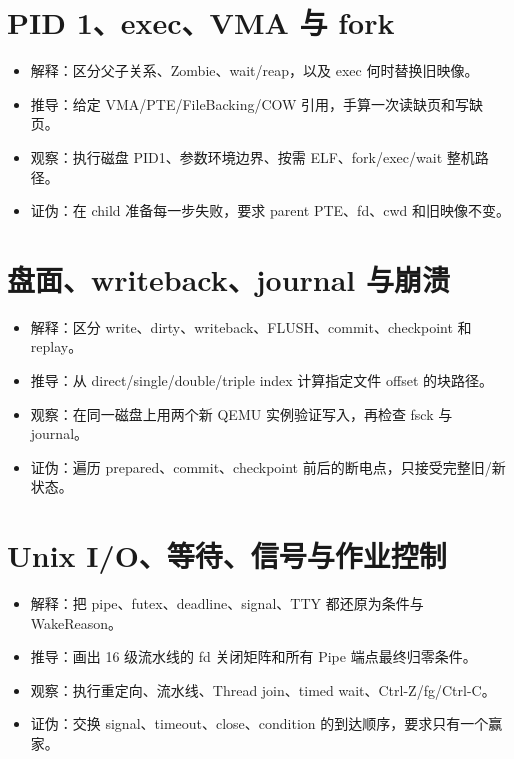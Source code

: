 \section*{PID 1、exec、VMA 与 fork}

\begin{itemize}
  \item 解释：区分父子关系、Zombie、wait/reap，以及 exec 何时替换旧映像。
  \item 推导：给定 VMA/PTE/FileBacking/COW 引用，手算一次读缺页和写缺页。
  \item 观察：执行磁盘 PID1、参数环境边界、按需 ELF、fork/exec/wait 整机路径。
  \item 证伪：在 child 准备每一步失败，要求 parent PTE、fd、cwd 和旧映像不变。
\end{itemize}

\section*{盘面、writeback、journal 与崩溃}

\begin{itemize}
  \item 解释：区分 write、dirty、writeback、FLUSH、commit、checkpoint 和 replay。
  \item 推导：从 direct/single/double/triple index 计算指定文件 offset 的块路径。
  \item 观察：在同一磁盘上用两个新 QEMU 实例验证写入，再检查 fsck 与 journal。
  \item 证伪：遍历 prepared、commit、checkpoint 前后的断电点，只接受完整旧/新状态。
\end{itemize}

\section*{Unix I/O、等待、信号与作业控制}

\begin{itemize}
  \item 解释：把 pipe、futex、deadline、signal、TTY 都还原为条件与 WakeReason。
  \item 推导：画出 16 级流水线的 fd 关闭矩阵和所有 Pipe 端点最终归零条件。
  \item 观察：执行重定向、流水线、Thread join、timed wait、Ctrl-Z/fg/Ctrl-C。
  \item 证伪：交换 signal、timeout、close、condition 的到达顺序，要求只有一个赢家。
\end{itemize}

